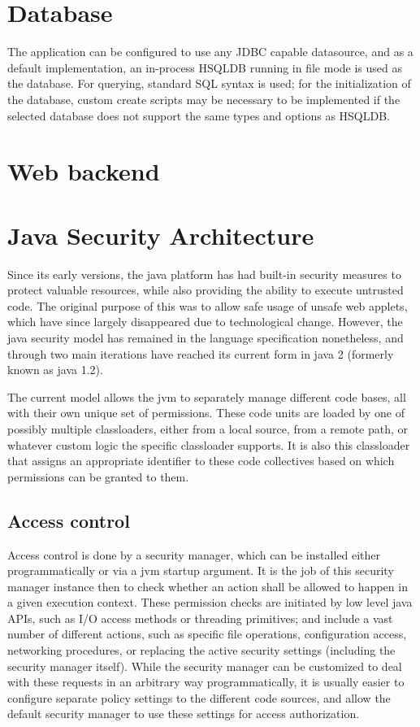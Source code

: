 	\section{Database}
 
 	The application can be configured to use any JDBC capable datasource, and as a default implementation, an in-process HSQLDB running in file mode is used as the database. For querying, standard SQL syntax is used; for the initialization of the database, custom create scripts may be necessary to be implemented if the selected database does not support the same types and options as HSQLDB.

	\section{Web backend}
	
	

	\section{Java Security Architecture}
	
	Since its early versions, the java platform has had built-in security measures to protect valuable resources, while also providing the ability to execute untrusted code. The original purpose of this was to allow safe usage of unsafe web applets, which have since largely disappeared due to technological change. However, the java security model has remained in the language specification nonetheless, and through two main iterations have reached its current form in java 2 (formerly known as java 1.2).
	
	The current model allows the jvm to separately manage different code bases, all with their own unique set of permissions. These code units are loaded by one of possibly multiple classloaders, either from a local source, from a remote path, or whatever custom logic the specific classloader supports. It is also this classloader that assigns an appropriate identifier to these code collectives based on which permissions can be granted to them.
	
	\subsection{Access control}
	
	Access control is done by a security manager, which can be installed either programmatically or via a jvm startup argument. It is the job of this security manager instance then to check whether an action shall be allowed to happen in a given execution context. These permission checks are initiated by low level java APIs, such as I/O access methods or threading primitives; and include a vast number of different actions, such as specific file operations, configuration access, networking procedures, or replacing the active security settings (including the security manager itself). While the security manager can be customized to deal with these requests in an arbitrary way programmatically, it is usually easier to configure separate policy settings to the different code sources, and allow the default security manager to use these settings for access authorization.
	
